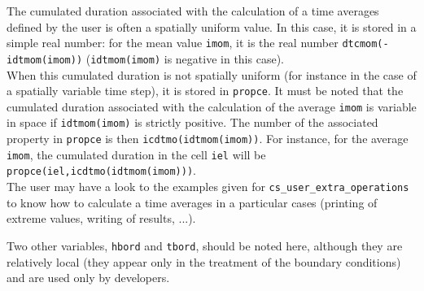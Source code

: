 {{{\label{sec:prg_moyennes}
The cumulated duration associated with the calculation of a time averages
defined by the user is often a spatially uniform value. In this case, it
is stored in a simple real number: for the mean value \texttt{imom}, it is the
real number \texttt{dtcmom(-idtmom(imom))}%
 (\texttt{idtmom(imom)} is negative in this case).\\
When this cumulated duration is not spatially uniform (for instance in the case
of a spatially variable time step), it is stored in \texttt{propce}. It must be
noted that the cumulated duration associated with the calculation of
the average \texttt{imom} is variable in space if \texttt{idtmom(imom)} is strictly
positive. The number of the associated property in \texttt{propce} is then
\texttt{icdtmo(idtmom(imom))}. For instance, for the
average \texttt{imom}, the cumulated duration in the cell \texttt{iel} will be
\texttt{propce(iel,icdtmo(idtmom(imom)))}.\\
The user may have a look to the examples given for
\texttt{cs\_user\_extra\_operations} to know
how to calculate a time averages in a particular cases (printing of extreme
values, writing of results, ...).

\bigskip

Two other variables, \texttt{hbord} and \texttt{tbord}, should be noted here,
although they are relatively local (they appear only in the treatment of the
boundary conditions) and are used only by developers.



}}}
